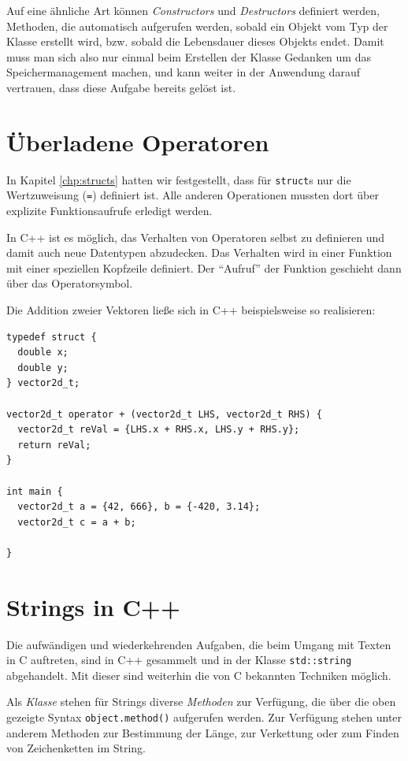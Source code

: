 Auf eine ähnliche Art können \emph{Constructors} und \emph{Destructors} definiert werden, \ie Methoden, die automatisch aufgerufen werden, sobald ein Objekt vom Typ der Klasse erstellt wird, bzw. sobald die Lebensdauer dieses Objekts endet. Damit muss man sich also nur einmal beim Erstellen der Klasse Gedanken um das Speichermanagement machen, und kann weiter in der Anwendung darauf vertrauen, dass diese Aufgabe bereits gelöst ist.


\section{Überladene Operatoren}
In Kapitel \ref{chp:structs} hatten wir festgestellt, dass für \texttt{struct}s nur die Wertzuweisung (\texttt{=}) definiert ist. Alle anderen Operationen mussten dort über explizite Funktionsaufrufe erledigt werden.

In C++ ist es möglich, das Verhalten von Operatoren selbst zu definieren und damit auch neue Datentypen abzudecken. Das Verhalten wird in einer Funktion mit einer speziellen Kopfzeile definiert. Der \enquote{Aufruf} der Funktion geschieht dann über das Operatorsymbol.

Die Addition zweier Vektoren ließe sich in C++ beispielsweise so realisieren:

\begin{codebox}
\begin{verbatim}
typedef struct {
  double x;
  double y;
} vector2d_t;

vector2d_t operator + (vector2d_t LHS, vector2d_t RHS) {
  vector2d_t reVal = {LHS.x + RHS.x, LHS.y + RHS.y};
  return reVal;
}

int main {
  vector2d_t a = {42, 666}, b = {-420, 3.14};
  vector2d_t c = a + b;

}
\end{verbatim}
\end{codebox}


\section{Strings in C++}
Die aufwändigen und wiederkehrenden Aufgaben, die beim Umgang mit Texten in C auftreten, sind in C++ gesammelt und in der Klasse \texttt{std::string} abgehandelt. Mit dieser sind weiterhin die von C bekannten Techniken möglich. 

Als \emph{Klasse} stehen für Strings diverse \emph{Methoden} zur Verfügung, die über die oben gezeigte Syntax \texttt{object.method()} aufgerufen werden. Zur Verfügung stehen unter anderem Methoden zur Bestimmung der Länge, zur Verkettung oder zum Finden von Zeichenketten im String.

